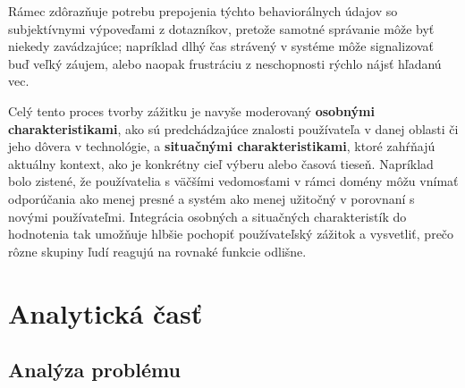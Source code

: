 Rámec zdôrazňuje potrebu prepojenia týchto behaviorálnych údajov so subjektívnymi výpoveďami z dotazníkov, pretože samotné správanie môže byť niekedy zavádzajúce; napríklad dlhý čas strávený v systéme môže signalizovať buď veľký záujem, alebo naopak frustráciu z neschopnosti rýchlo nájsť hľadanú vec. \cite{Knij} 

Celý tento proces tvorby zážitku je navyše moderovaný \textbf{osobnými charakteristikami}, ako sú predchádzajúce znalosti používateľa v danej oblasti či jeho dôvera v technológie, a \textbf{situačnými charakteristikami}, ktoré zahŕňajú aktuálny kontext, ako je konkrétny cieľ výberu alebo časová tieseň. \cite{Knij, challenges} Napríklad bolo zistené, že používatelia s väčšími vedomosťami v rámci domény môžu vnímať odporúčania ako menej presné a systém ako menej užitočný v porovnaní s novými používateľmi. Integrácia osobných a situačných charakteristík do hodnotenia tak umožňuje hlbšie pochopiť používateľský zážitok a vysvetliť, prečo rôzne skupiny ľudí reagujú na rovnaké funkcie odlišne. \cite{Knij}

  


\section{Analytická časť}\label{sec:AnalytickaCast}
\subsection{Analýza problému}

